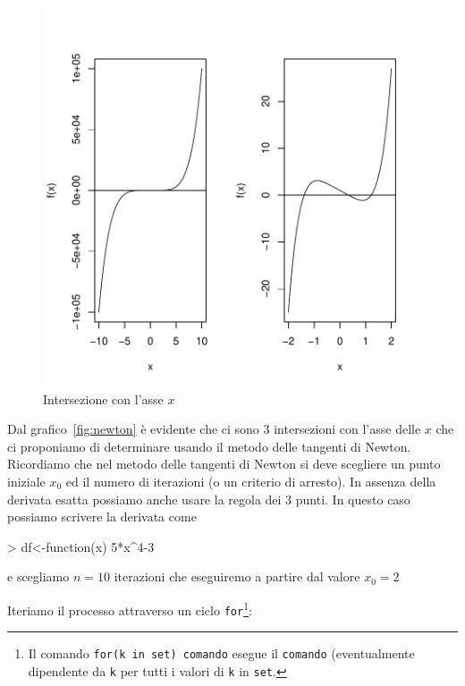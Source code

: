 \documentclass[onecolumn,11pt]{book}
\begin{document}
\begin{figure}[htbp]
\begin{center}
\includegraphics{Rmatematica-143}
\caption{Intersezione con l'asse $x$ }
\label{fig:tnewton}
\end{center}
\end{figure}
Dal grafico~\ref{fig:newton} \`e evidente che ci sono 3 intersezioni con l'asse delle $x$ che ci proponiamo di determinare usando il metodo delle tangenti di Newton. Ricordiamo che nel metodo delle tangenti di Newton si deve scegliere un punto iniziale $x_0$  ed il numero di iterazioni (o un criterio di arresto).
In assenza della derivata esatta possiamo anche usare la regola dei 3 punti. In questo caso possiamo scrivere la derivata come
\begin{Schunk}
\begin{Sinput}
> df<-function(x) 5*x^4-3
\end{Sinput}
\end{Schunk}
e scegliamo $n=10$ iterazioni che eseguiremo  a partire dal valore $x_0=2$

Iteriamo il processo attraverso un ciclo \texttt{for}\footnote{Il comando   \texttt{for(k in set) comando} esegue il \texttt{comando} (eventualmente dipendente da \texttt{k} per tutti i valori di \texttt{k} in \texttt{set}. }:
\end{document}
